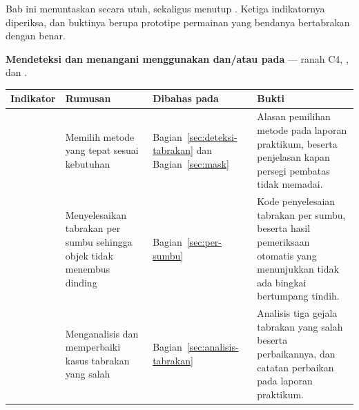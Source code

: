 \begin{subcpmkbox}
Bab ini menuntaskan  secara utuh, sekaligus menutup .
Ketiga indikatornya diperiksa, dan buktinya berupa prototipe permainan yang
bendanya bertabrakan dengan benar.

\vspace{0.5em}
\textbf{ Mendeteksi dan menangani  menggunakan
 dan/atau  pada } --- ranah C4,
,  dan .

\vspace{0.5em}
{\setlength{\tabcolsep}{4pt}\footnotesize%
\begin{tabularx}{\textwidth}{@{}C{1.9cm} L{4.0cm} L{2.5cm} Y@{}}
\toprule
\headrow \textbf{Indikator} & \textbf{Rumusan} & \textbf{Dibahas pada} & \textbf{Bukti} \\
\midrule
{} & Memilih metode  yang tepat sesuai kebutuhan &
Bagian~\ref{sec:deteksi-tabrakan} dan Bagian~\ref{sec:mask} &
Alasan pemilihan metode pada laporan praktikum, beserta penjelasan kapan
persegi pembatas tidak memadai. \\
\addlinespace
{} & Menyelesaikan tabrakan per sumbu sehingga objek tidak menembus dinding &
Bagian~\ref{sec:per-sumbu} &
Kode penyelesaian tabrakan per sumbu, beserta hasil pemeriksaan otomatis yang
menunjukkan tidak ada bingkai bertumpang tindih. \\
\addlinespace
{} & Menganalisis dan memperbaiki kasus tabrakan yang salah &
Bagian~\ref{sec:analisis-tabrakan} &
Analisis tiga gejala tabrakan yang salah beserta perbaikannya, dan catatan
perbaikan pada laporan praktikum. \\
\bottomrule
\end{tabularx}}
\end{subcpmkbox}
